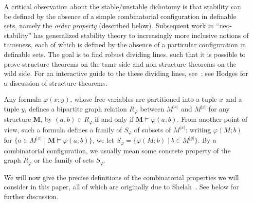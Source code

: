 \documentclass{lmcs}
\newcommand{\M}{\mathbf{M}}
\theoremstyle{thmC}
\begin{document}
A critical observation about the stable/unstable dichotomy is that stability can be defined by the absence of a simple combinatorial configuration in 
definable sets,
namely the \emph{order property} (described below). Subsequent work in ``neo-stability'' has generalized stability theory to increasingly more inclusive notions of tameness, each of which is defined by the absence of a particular configuration in 
definable sets.
The goal is to find robust dividing lines, such that it is possible to prove structure theorems on the tame side and non-structure theorems on the wild side. For an interactive guide to the these dividing lines, see~\cite{C}; see Hodges \cite{Hodges2} for a discussion of structure theorems.

Any formula $\varphi(x;y)$, whose free variables are partitioned into a tuple $x$ and a tuple $y$, defines a bipartite graph relation $R_\varphi$ between $M^{|x|}$ and $M^{|y|}$ for any structure $\M$, by $(a,b)\in R_\varphi$ if and only if $\M\models \varphi(a;b)$. From another point of view, such a formula defines a family of $S_\varphi$ of subsets of $M^{|x|}$: writing $\varphi(M;b)$ for $\{a\in M^{|x|}\mid \M\models \varphi(a;b)\}$, we let $S_\varphi = \{\varphi(M;b)\mid b\in M^{|y|}\}$. By a combinatorial configuration, we usually mean some concrete property of the graph $R_\varphi$ or the family of sets $S_\varphi$.

We will now give the precise definitions of the combinatorial properties we will consider in this paper, all
of which are originally due to Shelah~\cite{S}. See below for further discussion.
\end{document}
